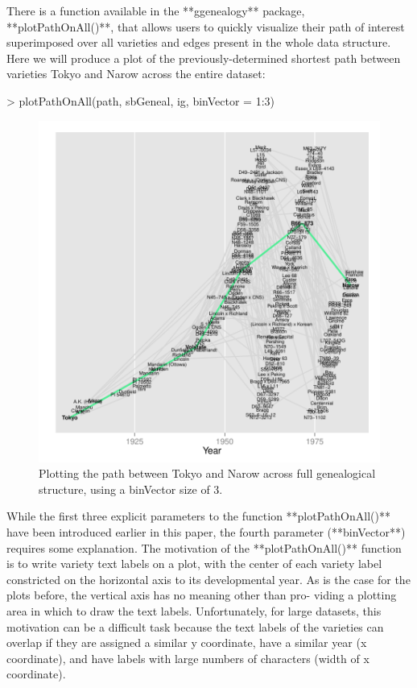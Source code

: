 \documentclass{article}
\numberwithin{equation}{section} %
\begin{document}
There is a function available in the **ggenealogy** package, **plotPathOnAll()**, that allows users to quickly visualize their path of interest superimposed over all varieties and edges present in the whole data structure. Here we will produce a plot of the previously-determined shortest path between varieties Tokyo and Narow across the entire dataset:

\begin{Schunk}
\begin{Sinput}
> plotPathOnAll(path, sbGeneal, ig, binVector = 1:3)
\end{Sinput}
\end{Schunk}

\begin{figure} 
  \begin{center} 
\includegraphics{ggenealogy-plotPathOnAll1}
\end{center} 
\caption{Plotting the path between Tokyo and Narow across full genealogical structure, using a binVector size of 3.}
\label{fig:plotPathOnAll1}
\end{figure}

While the first three explicit parameters to the function **plotPathOnAll()** have been introduced earlier in this paper, the fourth parameter (**binVector**) requires some explanation. The motivation of the **plotPathOnAll()** function is to write variety text labels on a plot, with the center of each variety label constricted on the horizontal axis to its developmental year. As is the case for the plots before, the vertical axis has no meaning other than pro- viding a plotting area in which to draw the text labels. Unfortunately, for large datasets, this motivation can be a difficult task because the text labels of the varieties can overlap if they are assigned a similar y coordinate, have a similar year (x coordinate), and have labels with large numbers of characters (width of x coordinate).
\end{document}
